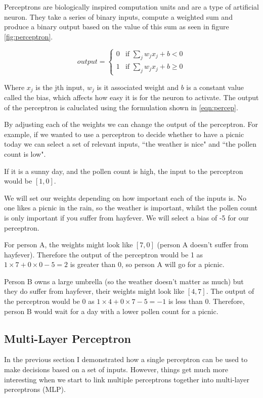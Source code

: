Perceptrons are biologically inspired computation units and are a type of artificial neuron. They take a series of binary inputs, compute a weighted sum and produce a binary output based on the value of this sum as seen in figure \ref{fig:perceptron}.


\begin{equation}
output = \begin{cases}
0 &\text{if $\sum_{j} w_j x_j + b < 0$}\\
1 &\text{if $\sum_{j} w_j x_j + b \geq 0$}
\end{cases}
\label{eqn:percep} 
\end{equation}

Where $x_j$ is the jth input, $w_j$ is it associated weight and $b$ is a constant value called the bias, which affects how easy it is for the neuron to activate. The output of the perceptron is caluclated using the formulation shown in \ref{eqn:percep}.

By adjusting each of the weights we can change the output of the perceptron. For example, if we wanted to use a perceptron to decide whether to have a picnic today we can  select a set of relevant inputs, ``the weather is nice" and ``the pollen count is low".

If it is a sunny day, and the pollen count is high, the input to the perceptron would be $[1,0]$.
 
We will set our weights depending on how important each of the inputs is. No one likes a picnic in the rain, so the weather is important, whilst the pollen count is only important if you suffer from hayfever. We will select a bias of -5 for our perceptron.

For person A, the weights might look like $[7, 0]$ (person A doesn't suffer from hayfever). Therefore the output of the perceptron would be 1 as $1 \times 7 + 0 \times 0 - 5 = 2$ is greater than 0, so person A will go for a picnic.

Person B owns a large umbrella (so the weather doesn't matter as much) but they do suffer from hayfever, their weights might look like $[4, 7]$. The output of the perceptron would be 0 as  $1 \times 4 + 0 \times 7 - 5 = -1$ is less than 0. Therefore, person B would wait for a day with a lower pollen count for a picnic.


\subsection{Multi-Layer Perceptron}
In the previous section I demonstrated how a single perceptron can be used to make decisions based on a set of inputs. However, things get much more interesting when we start to link multiple perceptrons together into multi-layer perceptrons (MLP).

